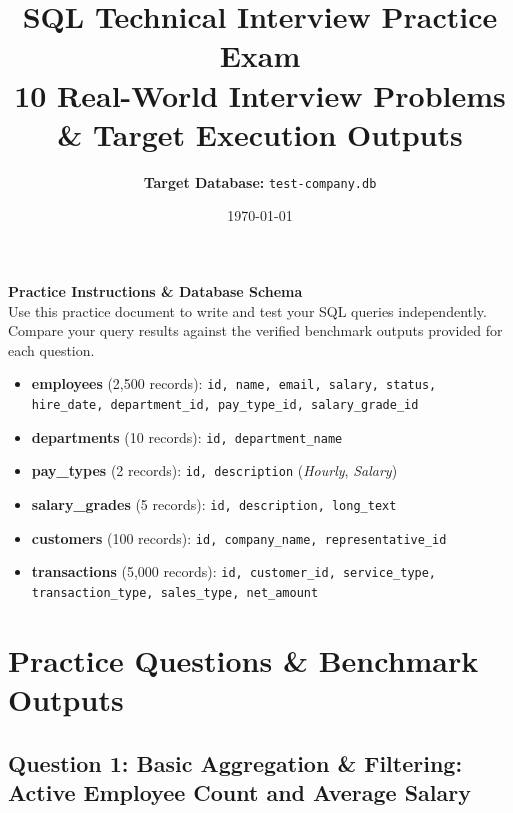\documentclass[11pt,a4paper]{article}
\title{\Huge \textbf{SQL Technical Interview Practice Exam}\\\Large 10 Real-World Interview Problems \& Target Execution Outputs}
\author{\textbf{Target Database:} \texttt{test-company.db}}
\date{\today}
\begin{document}
\maketitle

\begin{center}
\colorbox{gray!15}{
\parbox{0.95\textwidth}{
\vspace{0.2cm}
\textbf{\large Practice Instructions \& Database Schema} \\
Use this practice document to write and test your SQL queries independently. Compare your query results against the verified benchmark outputs provided for each question.

\begin{itemize}
    \item \textbf{employees} (2,500 records): \texttt{id, name, email, salary, status, hire\_date, department\_id, pay\_type\_id, salary\_grade\_id}
    \item \textbf{departments} (10 records): \texttt{id, department\_name}
    \item \textbf{pay\_types} (2 records): \texttt{id, description} (\textit{Hourly}, \textit{Salary})
    \item \textbf{salary\_grades} (5 records): \texttt{id, description, long\_text}
    \item \textbf{customers} (100 records): \texttt{id, company\_name, representative\_id}
    \item \textbf{transactions} (5,000 records): \texttt{id, customer\_id, service\_type, transaction\_type, sales\_type, net\_amount}
\end{itemize}
\vspace{0.2cm}
}
}
\end{center}

\vspace{0.3cm}
\tableofcontents
\newpage

\section{Practice Questions \& Benchmark Outputs}

\subsection*{Question 1: Basic Aggregation & Filtering: Active Employee Count and Average Salary}
\end{document}
